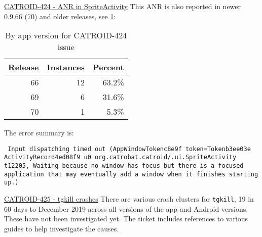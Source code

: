 \href{https://jira.catrob.at/browse/CATROID-424}{CATROID-424 - ANR in SpriteActivity} This ANR is also reported in newer 0.9.66 (70) and older releases, see \ref{tab:catroid_424}:

\begin{table}[htbp!]
    \centering
    \begin{tabular}{r|r|r}
Release	&Instances	&Percent \\
\hline
66	&12	&63.2\% \\
69	&6	&31.6\% \\
70	&1	&5.3\% \\
    \end{tabular}
    \caption{By app version for CATROID-424 issue}
    \label{tab:catroid_424}
\end{table}

The error summary is:

\texttt{\footnotesize{
Input dispatching timed out (AppWindowToken{c8e9f token=Token{b3ee03e ActivityRecord{4ed08f9 u0 org.catrobat.catroid/.ui.SpriteActivity t12205}}}, Waiting because no window has focus but there is a focused application that may eventually add a window when it finishes starting up.)}}

\href{https://jira.catrob.at/browse/CATROID-425}{CATROID-425 - tgkill crashes} There are various crash clusters for \texttt{tgkill}, 19 in 60 days to  December 2019 across all versions of the app and Android versions. These have not been investigated yet. The ticket includes references to various guides to help investigate the causes.

